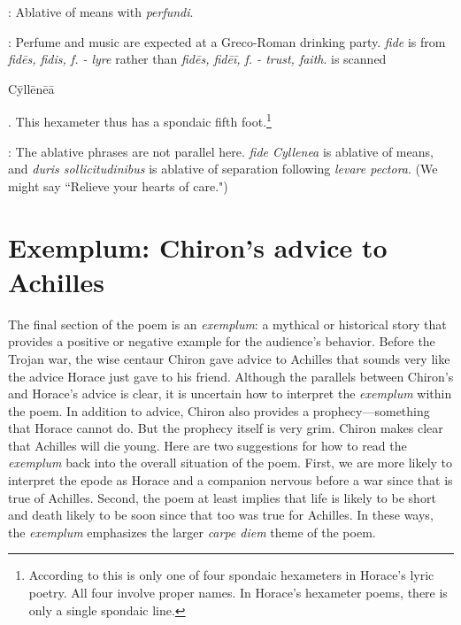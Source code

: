 
: Ablative of means with \textit{perfundi}.


: Perfume and music are expected at a Greco-Roman drinking party.  \textit{fide} is from \textit{fidēs, fidis, f. - lyre} rather than \textit{fidēs, fidēī, f. - trust, faith}.\indent{} is scanned \begin{metrica}C\=yll\=en\=e\=a\end{metrica}.  This hexameter thus has a spondaic fifth foot.\footnote{According to \citet[220]{mankin1995} this is only one of four spondaic hexameters in Horace's lyric poetry.  All four involve proper names.  In Horace's hexameter poems, there is only a single spondaic line.}


: The ablative phrases are not parallel here.  \textit{fide Cyllenea} is ablative of means, and \textit{duris sollicitudinibus} is ablative of separation following \textit{levare pectora}.  (We might say ``Relieve your hearts of care.") 


\section*{Exemplum: Chiron's advice to Achilles}

The final section of the poem is an \textit{exemplum}: a mythical or historical story that provides a positive or negative example for the audience's behavior.  Before the Trojan war, the wise centaur Chiron gave advice to Achilles that sounds very like the advice Horace just gave to his friend.  Although the parallels between Chiron's and Horace's advice is clear, it is uncertain how to interpret the \textit{exemplum} within the poem.  In addition to advice, Chiron also provides a prophecy---something that Horace cannot do.  But the prophecy itself is very grim.  Chiron makes clear that Achilles will die young.  Here are two suggestions for how to read the \textit{exemplum} back into the overall situation of the poem.  First, we are more likely to interpret the epode as Horace and a companion nervous before a war since that is true of Achilles.  Second, the poem at least implies that life is likely to be short and death likely to be soon since that too was true for Achilles.  In these ways, the \textit{exemplum} emphasizes the larger \textit{carpe diem} theme of the poem.


